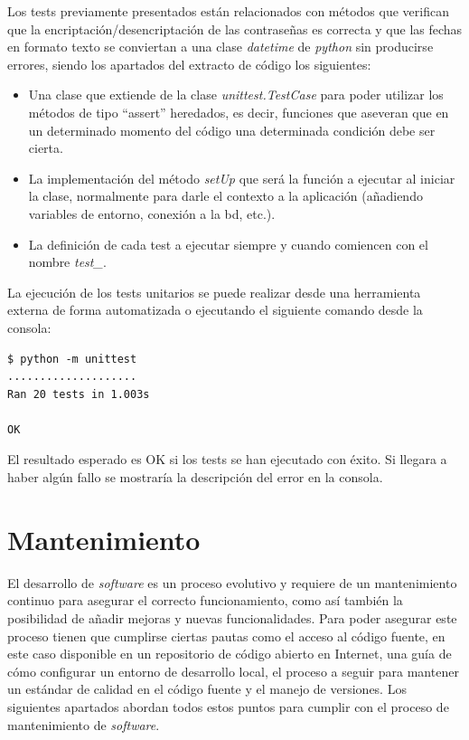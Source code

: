 \documentclass[11pt,spanish,listoffigures,listoftables]{tfgetsinf}
\begin{document}
Los tests previamente presentados están relacionados con métodos que verifican que la encriptación/desencriptación de las contraseñas es correcta y que las fechas en formato texto se conviertan a una clase \textit{datetime} de \textit{python} sin producirse errores, siendo los apartados del extracto de código los siguientes:

\begin{itemize}
	\item Una clase que extiende de la clase \textit{unittest.TestCase} para poder utilizar los métodos de tipo ``assert'' heredados, es decir, funciones que aseveran que en un determinado momento del código una determinada condición debe ser cierta.
    \item La implementación del método \textit{setUp} que será la función a ejecutar al iniciar la clase, normalmente para darle el contexto a la aplicación (añadiendo variables de entorno, conexión a la \acrshort{bd}, etc.).
	\item La definición de cada test a ejecutar siempre y cuando comiencen con el nombre \textit{test\_}.
\end{itemize}

La ejecución de los tests unitarios se puede realizar desde una herramienta externa de forma automatizada o ejecutando el siguiente comando desde la consola:

\begin{lstlisting}[style=ascii-tree]
$ python -m unittest
....................
Ran 20 tests in 1.003s

OK
\end{lstlisting}

El resultado esperado es OK si los tests se han ejecutado con éxito. Si llegara a haber algún fallo se mostraría la descripción del error en la consola. 

\chapter{Mantenimiento}

El desarrollo de \textit{software} es un proceso evolutivo y requiere de un mantenimiento continuo para asegurar el correcto funcionamiento, como así también la posibilidad de añadir mejoras y nuevas funcionalidades. Para poder asegurar este proceso tienen que cumplirse ciertas pautas como el acceso al código fuente, en este caso disponible en un repositorio de código abierto en Internet, una guía de cómo configurar un entorno de desarrollo local, el proceso a seguir para mantener un estándar de calidad en el código fuente y el manejo de versiones. Los siguientes apartados abordan todos estos puntos para cumplir con el proceso de mantenimiento de \textit{software}.
\end{document}
